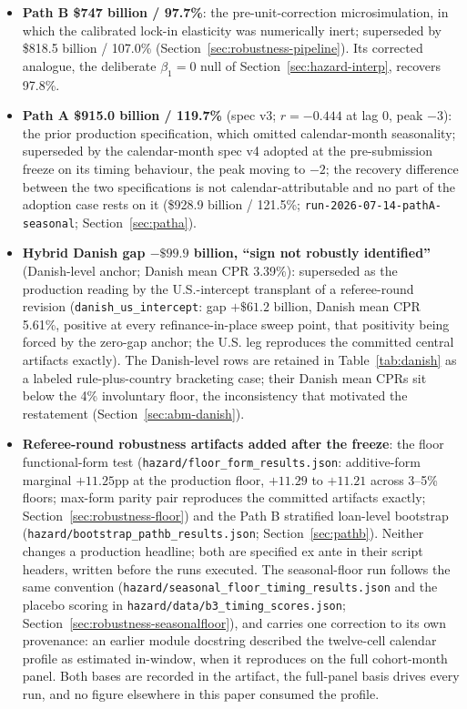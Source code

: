 \documentclass[12pt]{article}
\begin{document}
\begin{itemize}
\item \textbf{Path B \$747 billion / 97.7\%}: the pre-unit-correction microsimulation, in which the calibrated lock-in elasticity was numerically inert; superseded by \$818.5 billion / 107.0\% (Section~\ref{sec:robustness-pipeline}). Its corrected analogue, the deliberate $\beta_1 = 0$ null of Section~\ref{sec:hazard-interp}, recovers 97.8\%.
\item \textbf{Path A \$915.0 billion / 119.7\%} (spec v3; $r = -0.444$ at lag 0, peak $-3$): the prior production specification, which omitted calendar-month seasonality; superseded by the calendar-month spec v4 adopted at the pre-submission freeze on its timing behaviour, the peak moving to $-2$; the recovery difference between the two specifications is not calendar-attributable and no part of the adoption case rests on it (\$928.9 billion / 121.5\%; \texttt{run-2026-07-14-pathA-seasonal}; Section~\ref{sec:patha}).
\item \textbf{Hybrid Danish gap $-\$99.9$ billion, ``sign not robustly identified''} (Danish-level anchor; Danish mean CPR 3.39\%): superseded as the production reading by the U.S.-intercept transplant of a referee-round revision (\texttt{danish\_us\_intercept}: gap $+\$61.2$ billion, Danish mean CPR 5.61\%, positive at every refinance-in-place sweep point, that positivity being forced by the zero-gap anchor; the U.S. leg reproduces the committed central artifacts exactly). The Danish-level rows are retained in Table~\ref{tab:danish} as a labeled rule-plus-country bracketing case; their Danish mean CPRs sit below the 4\% involuntary floor, the inconsistency that motivated the restatement (Section~\ref{sec:abm-danish}).
\item \textbf{Referee-round robustness artifacts added after the freeze}: the floor functional-form test (\texttt{hazard/floor\_form\_results.json}: additive-form marginal $+11.25$pp at the production floor, $+11.29$ to $+11.21$ across 3--5\% floors; max-form parity pair reproduces the committed artifacts exactly; Section~\ref{sec:robustness-floor}) and the Path B stratified loan-level bootstrap (\texttt{hazard/bootstrap\_pathb\_results.json}; Section~\ref{sec:pathb}). Neither changes a production headline; both are specified ex ante in their script headers, written before the runs executed. The seasonal-floor run follows the same convention (\texttt{hazard/seasonal\_floor\_timing\_results.json} and the placebo scoring in \texttt{hazard/data/b3\_timing\_scores.json}; Section~\ref{sec:robustness-seasonalfloor}), and carries one correction to its own provenance: an earlier module docstring described the twelve-cell calendar profile as estimated in-window, when it reproduces on the full cohort-month panel. Both bases are recorded in the artifact, the full-panel basis drives every run, and no figure elsewhere in this paper consumed the profile.
\end{itemize}
\endgroup
\end{document}
